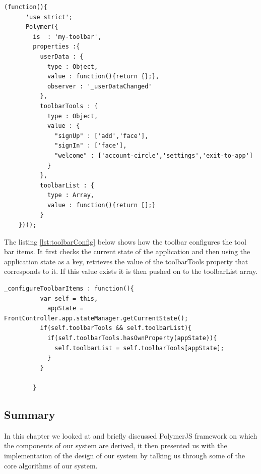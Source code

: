 \begin{lstlisting}[caption={toolbar instance}, label={lst:toolbar}]
 (function(){
      'use strict';
      Polymer({
        is  : 'my-toolbar',
        properties :{
          userData : {
            type : Object,
            value : function(){return {};},
            observer : '_userDataChanged'
          },
          toolbarTools : {
            type : Object,
            value : {
              "signUp" : ['add','face'],
              "signIn" : ['face'],
              "welcome" : ['account-circle','settings','exit-to-app']
            }
          },
          toolbarList : {
            type : Array,
            value : function(){return [];}
          }
    })();
\end{lstlisting}
The listing \ref{lst:toolbarConfig} below shows how the toolbar configures the tool bar items. It first checks the current state of the application and then using the application state as a key,  retrieves the value of the toolbarTools property that corresponds to it.
If this value exists it is then pushed on to the toolbarList array.
\begin{lstlisting}[caption={Configuring toolbar items}, label={lst:toolbarConfig}]
_configureToolbarItems : function(){
          var self = this,
            appState = FrontController.app.stateManager.getCurrentState();
          if(self.toolbarTools && self.toolbarList){
            if(self.toolbarTools.hasOwnProperty(appState)){
              self.toolbarList = self.toolbarTools[appState];
            }
          }

        }
\end{lstlisting}
\subsection{Summary}
In this chapter we looked at and briefly discussed PolymerJS framework on which the components of our system are derived, it then presented us with the implementation of the design of our system by talking us through some of the core algorithms of our system.


